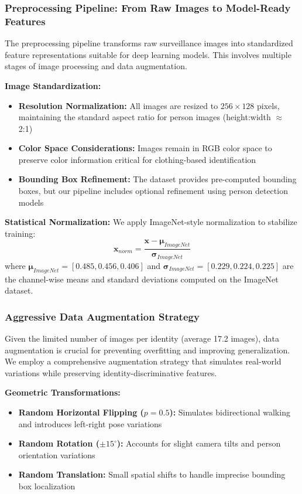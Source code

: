 \documentclass[a4paper,12pt]{article}
\begin{document}
\subsubsection{Preprocessing Pipeline: From Raw Images to Model-Ready Features}

The preprocessing pipeline transforms raw surveillance images into standardized feature representations suitable for deep learning models. This involves multiple stages of image processing and data augmentation.

\textbf{Image Standardization:}
\begin{itemize}
    \item \textbf{Resolution Normalization:} All images are resized to $256 \times 128$ pixels, maintaining the standard aspect ratio for person images (height:width $\approx$ 2:1)
    \item \textbf{Color Space Considerations:} Images remain in RGB color space to preserve color information critical for clothing-based identification
    \item \textbf{Bounding Box Refinement:} The dataset provides pre-computed bounding boxes, but our pipeline includes optional refinement using person detection models
\end{itemize}

\textbf{Statistical Normalization:}
We apply ImageNet-style normalization to stabilize training:
\[
\mathbf{x}_{norm} = \frac{\mathbf{x} - \boldsymbol{\mu}_{ImageNet}}{\boldsymbol{\sigma}_{ImageNet}}
\]
where $\boldsymbol{\mu}_{ImageNet} = [0.485, 0.456, 0.406]$ and $\boldsymbol{\sigma}_{ImageNet} = [0.229, 0.224, 0.225]$ are the channel-wise means and standard deviations computed on the ImageNet dataset.

\subsubsection{Aggressive Data Augmentation Strategy}

Given the limited number of images per identity (average 17.2 images), data augmentation is crucial for preventing overfitting and improving generalization. We employ a comprehensive augmentation strategy that simulates real-world variations while preserving identity-discriminative features.

\textbf{Geometric Transformations:}
\begin{itemize}
    \item \textbf{Random Horizontal Flipping ($p=0.5$):} Simulates bidirectional walking and introduces left-right pose variations
    \item \textbf{Random Rotation ($\pm 15^\circ$):} Accounts for slight camera tilts and person orientation variations
    \item \textbf{Random Translation:} Small spatial shifts to handle imprecise bounding box localization
\end{itemize}
\end{document}
